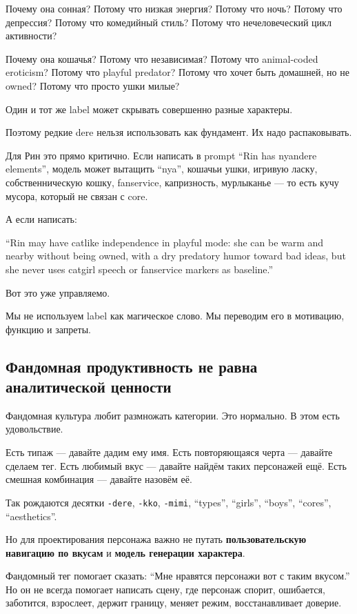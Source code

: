 Почему она сонная? Потому что низкая энергия? Потому что ночь? Потому
что депрессия? Потому что комедийный стиль? Потому что нечеловеческий
цикл активности?

Почему она кошачья? Потому что независимая? Потому что animal-coded
eroticism? Потому что playful predator? Потому что хочет быть домашней,
но не owned? Потому что просто ушки милые?

Один и тот же label может скрывать совершенно разные характеры.

Поэтому редкие dere нельзя использовать как фундамент. Их надо
распаковывать.

Для Рин это прямо критично. Если написать в prompt ``Rin has nyandere
elements'', модель может вытащить ``nya'', кошачьи ушки, игривую ласку,
собственническую кошку, fanservice, капризность, мурлыканье --- то есть
кучу мусора, который не связан с core.

А если написать:

``Rin may have catlike independence in playful mode: she can be warm and
nearby without being owned, with a dry predatory humor toward bad ideas,
but she never uses catgirl speech or fanservice markers as baseline.''

Вот это уже управляемо.

Мы не используем label как магическое слово. Мы переводим его в
мотивацию, функцию и запреты.

\subsection*{Фандомная продуктивность не равна аналитической ценности}

Фандомная культура любит размножать категории. Это нормально. В этом
есть удовольствие.

Есть типаж --- давайте дадим ему имя. Есть повторяющаяся черта ---
давайте сделаем тег. Есть любимый вкус --- давайте найдём таких
персонажей ещё. Есть смешная комбинация --- давайте назовём её.

Так рождаются десятки \texttt{-dere}, \texttt{-kko}, \texttt{-mimi},
``types'', ``girls'', ``boys'', ``cores'', ``aesthetics''.

Но для проектирования персонажа важно не путать \textbf{пользовательскую
навигацию по вкусам} и \textbf{модель генерации характера}.

Фандомный тег помогает сказать: ``Мне нравятся персонажи вот с таким
вкусом.'' Но он не всегда помогает написать сцену, где персонаж спорит,
ошибается, заботится, взрослеет, держит границу, меняет режим,
восстанавливает доверие.


